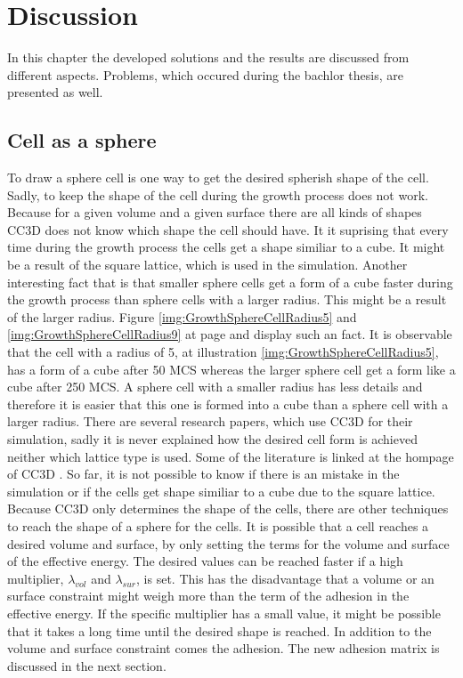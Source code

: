 \chapter{Discussion}
In this chapter the developed solutions and the results are discussed from different aspects. Problems, which occured during the bachlor thesis, are presented as well.

\section{Cell as a sphere}
To draw a sphere cell is one way to get the desired spherish shape of the cell. Sadly, to keep the shape of the cell during the growth process does not work. Because for a given volume and a given surface there are all kinds of shapes \ac{CC3D} does not know which shape the cell should have. It it suprising that every time during the growth process the cells get a shape similiar to a cube. It might be a result of the square lattice, which is used in the simulation. Another interesting fact that is that smaller sphere cells get a form of a cube faster during the growth process than sphere cells with a larger radius. This might be a result of the larger radius. Figure \ref{img:GrowthSphereCellRadius5} and \ref{img:GrowthSphereCellRadius9} at page \pageref{img:GrowthSphereCellRadius5} and \pageref{img:GrowthSphereCellRadius9} display such an fact. It is observable that the cell with a radius of 5, at illustration \ref{img:GrowthSphereCellRadius5}, has a form of a cube after 50 \ac{MCS} whereas the larger sphere cell get a form like a cube after 250 \ac{MCS}. A sphere cell with a smaller radius has less details and therefore it is easier that this one is formed into a cube than a sphere cell with a larger radius. \newline
There are several research papers, which use \ac{CC3D} for their simulation, sadly it is never explained how the desired cell form is achieved neither which lattice type is used. Some of the literature is linked at the hompage of \ac{CC3D} \cite{CC3D.org}. So far, it is not possible to know if there is an mistake in the simulation or if the cells get shape similiar to a cube due to the square lattice. \newline
Because \ac{CC3D} only determines the shape of the cells, there are other techniques to reach the shape of a sphere for the cells. It is possible that a cell reaches a desired volume and surface, by only setting the terms for the volume and surface of the effective energy. The desired values can be reached faster if a high multiplier, $\lambda_{vol}$ and $\lambda_{sur}$, is set. This has the disadvantage that a volume or an surface constraint might weigh more than the term of the adhesion in the effective energy. If the specific multiplier has a small value, it might be possible that it takes a long time until the desired shape is reached. In addition to the volume and surface constraint comes the adhesion. The new adhesion matrix is discussed in the next section.

